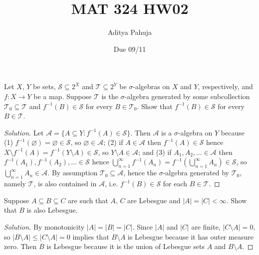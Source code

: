 \documentclass[10pt]{article}
\title{MAT 324 HW02}
\author{\large Aditya Pahuja}
\date{\large Due 09/11}
\providecommand{\inv}{^{-1}}
\newenvironment{soln}{\begin{proof}[Solution]}{\end{proof}}
\providecommand{\abs}[1]{\left|#1\right|}
\begin{document}
\maketitle

\begin{problem}
    Let $X$, $Y$ be sets, $\mathcal S\subseteq 2^X$ and $\mathcal T\subseteq 2^Y$
    be $\sigma$-algebras on $X$ and $Y$, respectively,
    and $f\colon X\to Y$ be a map.
    Suppose $\mathcal T$ is the $\sigma$-algebra generated by
    some subcollection $\mathcal T_0\subseteq\mathcal T$ and
    $f\inv(B)\in\mathcal S$ for every $B\in\mathcal T_0$.
    Show that $f\inv(B)\in\mathcal S$ for every $B\in\mathcal T$.
\end{problem}

\begin{soln}
    Let $\mathcal A = \{ A\subseteq Y : f\inv(A)\in\mathcal S\}$.
    Then $\mathcal A$ is a $\sigma$-algebra on $Y$ because
    (1) $f\inv(\varnothing) = \varnothing\in\mathcal S$,
    so $\varnothing\in \mathcal A$;
    (2) if $A\in\mathcal A$ then $f\inv(A)\in\mathcal S$
    hence $X\setminus f\inv(A) = f\inv(Y\setminus A)\in\mathcal S$,
    so $Y\setminus A\in\mathcal A$; and
    (3) if $A_1,A_2,\ldots\in\mathcal A$ then
    $f\inv(A_1),f\inv(A_2),\dots\in\mathcal S$ hence
    $\bigcup_{n=1}^\infty f\inv(A_n) =
    f\inv\left(\bigcup_{n=1}^\infty A_n\right)\in\mathcal S$,
    so $\bigcup_{n=1}^\infty A_n\in\mathcal A$.
    By assumption $\mathcal T_0\subseteq\mathcal A$,
    hence the $\sigma$-algebra generated by $\mathcal T_0$,
    namely $\mathcal T$, is also contained in $\mathcal A$,
    i.e. $f\inv(B)\in\mathcal S$ for each $B\in\mathcal T$.
\end{soln}


\begin{problem}
    Suppose $A\subseteq B\subseteq C$ are such that $A$, $C$ are Lebesgue
    and $\abs A = \abs C < \infty$. Show that $B$ is also Lebesgue.
\end{problem}

\begin{soln}
    By monotonicity $\abs A = \abs B = \abs C$.
    Since $\abs A$ and $\abs C$ are finite,
    $\abs{C\setminus A} = 0$, so $\abs{B\setminus A}\le\abs{C\setminus A}=0$
    implies that $B\setminus A$ is Lebesgue because it has outer measure zero.
    Then $B$ is Lebesgue because it is the union of Lebesgue sets
    $A$ and $B\setminus A$.
\end{soln}
\end{document}
